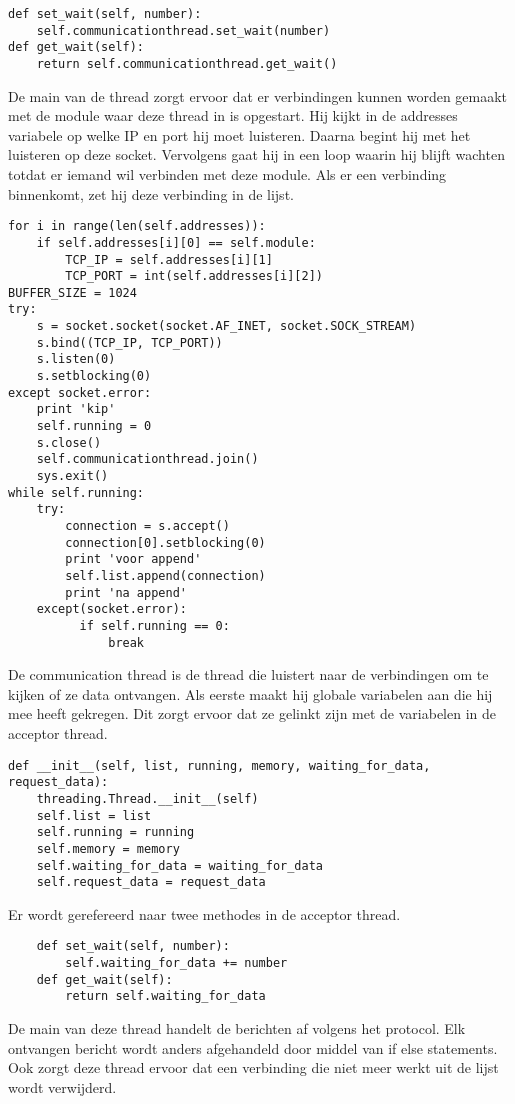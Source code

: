 \documentclass[a4paper,10pt]{article}
\begin{document}
\begin{verbatim}
def set_wait(self, number):
    self.communicationthread.set_wait(number)
def get_wait(self):
    return self.communicationthread.get_wait()
\end{verbatim}
De main van de thread zorgt ervoor dat er verbindingen kunnen worden gemaakt met de module waar deze thread in is opgestart. Hij kijkt in de addresses variabele op welke IP en port hij moet luisteren. Daarna begint hij met het luisteren op deze socket. Vervolgens gaat hij in een loop waarin hij blijft wachten totdat er iemand wil verbinden met deze module. Als er een verbinding binnenkomt, zet hij deze verbinding in de lijst.
\begin{verbatim}
for i in range(len(self.addresses)):
    if self.addresses[i][0] == self.module:
        TCP_IP = self.addresses[i][1]
        TCP_PORT = int(self.addresses[i][2])
BUFFER_SIZE = 1024
try:
    s = socket.socket(socket.AF_INET, socket.SOCK_STREAM)
    s.bind((TCP_IP, TCP_PORT))
    s.listen(0)
    s.setblocking(0)
except socket.error:
    print 'kip'
    self.running = 0
    s.close()
    self.communicationthread.join()
    sys.exit()
while self.running:
    try:
        connection = s.accept()
        connection[0].setblocking(0)
        print 'voor append'
        self.list.append(connection)
        print 'na append'
    except(socket.error):
	      if self.running == 0:
	          break
\end{verbatim}
De communication thread is de thread die luistert naar de verbindingen om te kijken of ze data ontvangen. Als eerste maakt hij globale variabelen aan die hij mee heeft gekregen. Dit zorgt ervoor dat ze gelinkt zijn met de variabelen in de acceptor thread.
\begin{verbatim}
def __init__(self, list, running, memory, waiting_for_data, request_data):
    threading.Thread.__init__(self)
    self.list = list
    self.running = running
    self.memory = memory
    self.waiting_for_data = waiting_for_data
    self.request_data = request_data
\end{verbatim}
Er wordt gerefereerd naar twee methodes in de acceptor thread. %
\begin{verbatim}
    def set_wait(self, number):
        self.waiting_for_data += number
    def get_wait(self):
        return self.waiting_for_data
\end{verbatim}
De main van deze thread handelt de berichten af volgens het protocol. Elk ontvangen bericht wordt anders afgehandeld door middel van if else statements. Ook zorgt deze thread ervoor dat een verbinding die niet meer werkt uit de lijst wordt verwijderd.
\end{document}
